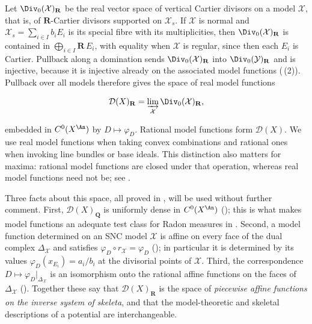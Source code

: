 Let $\Div_0(\mathcal X)_{\mathbf R}$ be the real vector space of vertical
Cartier divisors on a model $\mathcal X$, that is, of $\mathbf R$-Cartier
divisors supported on $\mathcal X_s$.  If $\mathcal X$ is normal and
$\mathcal X_s=\sum_{i\in I}b_iE_i$ is its special fibre with its
multiplicities, then $\Div_0(\mathcal X)_{\mathbf R}$ is contained in
$\bigoplus_{i\in I}\mathbf R\,E_i$, with equality when $\mathcal X$ is
regular, since then each $E_i$ is Cartier.  Pullback along a domination
sends $\Div_0(\mathcal X)_{\mathbf R}$ into
$\Div_0(\mathcal Y)_{\mathbf R}$ and is injective, because it is injective
already on the associated model functions
(\,(2)).  Pullback over all models
therefore gives the space of real model functions

\begin{equation}
\label{eq:ch20-model-functions}
 \mathcal D(X)_{\mathbf R}
   =\varinjlim_{\mathcal X}\Div_0(\mathcal X)_{\mathbf R},
\end{equation}

embedded in $C^0(X^{\An})$ by $D\mapsto\varphi_D$.  Rational model
functions form $\mathcal D(X)$.  We use real model functions when taking
convex combinations and rational ones when invoking line bundles or base
ideals.  This distinction also matters for maxima: rational model functions
are closed under that operation, whereas real model functions need not be;
see .

Three facts about this space, all proved in ,
will be used without further comment.  First, $\mathcal D(X)_{\mathbf Q}$
is uniformly dense in $C^0(X^{\An})$
(); this is what makes model
functions an adequate test class for Radon measures in
.  Second, a model function determined on an SNC model
$\mathcal X$ is affine on every face of the dual complex
$\Delta_{\mathcal X}$ and satisfies
$\varphi_D\circ r_{\mathcal X}=\varphi_D$
(); in particular it is determined by its
values $\varphi_D(x_{E_i})=a_i/b_i$ at the divisorial points of
$\mathcal X$.  Third, the correspondence
$D\mapsto\varphi_D|_{\Delta_{\mathcal X}}$ is an isomorphism onto the
rational affine functions on the faces of $\Delta_{\mathcal X}$
().  Together these say that
$\mathcal D(X)_{\mathbf R}$ is the space of \emph{piecewise affine
functions on the inverse system of skeleta}, and that the model-theoretic
and skeletal descriptions of a potential are interchangeable.

